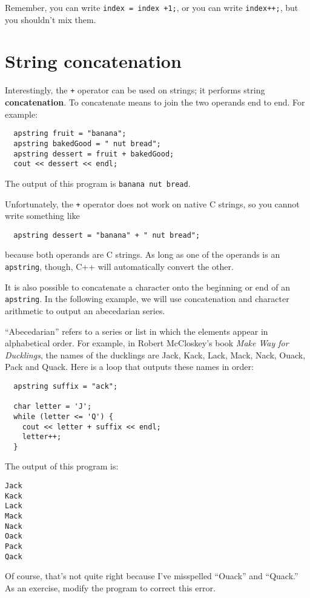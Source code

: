 Remember, you can write {\tt index = index +1;}, or you
can write {\tt index++;}, but you shouldn't mix them.

\section{String concatenation}

Interestingly, the {\tt +} operator can be used on strings;
it performs string {\bf concatenation}.  To concatenate means to
join the two operands end to end.  For example:

\begin{verbatim}
  apstring fruit = "banana";
  apstring bakedGood = " nut bread";
  apstring dessert = fruit + bakedGood;
  cout << dessert << endl;
\end{verbatim}
%
The output of this program is {\tt banana nut bread}.

Unfortunately, the {\tt +} operator does not work on native
C strings, so you cannot write something like

\begin{verbatim}
  apstring dessert = "banana" + " nut bread";
\end{verbatim}
%
because both operands are C strings.  As long as one of the
operands is an {\tt apstring}, though, C++ will automatically
convert the other.

It is also possible to concatenate a character onto the
beginning or end of an {\tt apstring}.  In the following example, we
will use concatenation and character arithmetic to output
an abecedarian series.

``Abecedarian'' refers to a series or list in which the elements
appear in alphabetical order.  For example, in Robert McCloskey's book
{\em Make Way for Ducklings}, the names of the ducklings are Jack,
Kack, Lack, Mack, Nack, Ouack, Pack and Quack.  Here is a loop that
outputs these names in order:

\begin{verbatim}
  apstring suffix = "ack";

  char letter = 'J';
  while (letter <= 'Q') {
    cout << letter + suffix << endl;
    letter++;
  }
\end{verbatim}
%
The output of this program is:

\begin{verbatim}
Jack
Kack
Lack
Mack
Nack
Oack
Pack
Qack
\end{verbatim}
%
Of course, that's not quite right because I've misspelled ``Ouack''
and ``Quack.''  As an exercise, modify the program to correct
this error.

